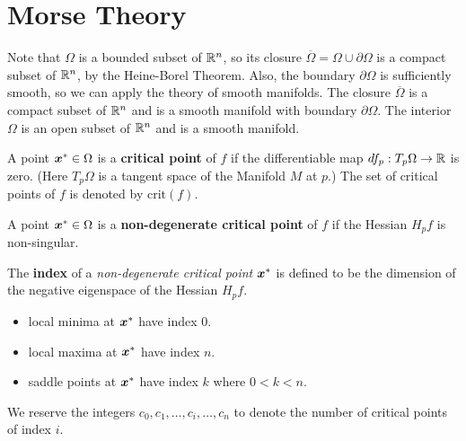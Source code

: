 \documentclass[10pt]{article}
\begin{document}
\section{Morse Theory}
    \label{sec:theory}
    
    \medskip

    Note that $\Omega$ is a bounded subset of $\mathbb{R}^n$, so its closure
    $\overline{\Omega} = \Omega \cup \partial \Omega$ is a compact subset
    of $\mathbb{R}^n$, by the Heine-Borel Theorem.
    Also, the boundary $\partial \Omega$ is sufficiently smooth,
    so we can apply the theory of smooth manifolds.
    The closure $\overline{\Omega}$ is a compact subset of $\mathbb{R}^n$ and
    is a smooth manifold with boundary $\partial \Omega$.
    The interior $\Omega$ is an open subset of $\mathbb{R}^n$ and is a smooth manifold.\\


    \begin{definition}
            A point $\bm{x}^* \in \Omega$ is a \textbf{critical point} of $f$ if the
            differentiable map $df_p: T_p \Omega \rightarrow \mathbb{R}$ is zero. (Here
            $T_p \Omega$ is a tangent space of the Manifold $M$ at $p$.) 
            The set of critical points of $f$ is denoted by $\text{crit}(f)$.
    \end{definition}

    \begin{definition}
            A point $\bm{x}^* \in \Omega$ is a \textbf{non-degenerate critical point} of $f$ if
            the Hessian $H_p f$ is non-singular.
    \end{definition}

    \begin{definition}
            The \textbf{index} of a \emph{non-degenerate critical point} $\bm{x}^*$ is defined to be
            the dimension of the negative eigenspace of the Hessian $H_p f$.
            \begin{itemize}
                \item local minima at $\bm{x}^*$ have index $0$.
                \item local maxima at $\bm{x}^*$ have index $n$.
                \item saddle points at $\bm{x}^*$ have index $k$ where $0 < k < n$.
            \end{itemize}
            We reserve the integers $c_0, c_1, \dots, c_i, \dots, c_n$ to denote the number of
            critical points of index $i$.
    \end{definition}
\end{document}
